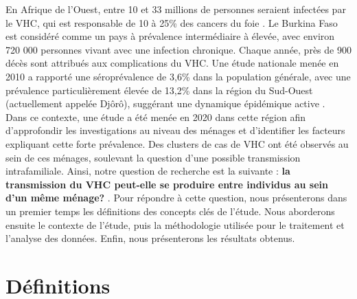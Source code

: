 \documentclass[a4paper,12pt]{article}
\begin{document}
 
En Afrique de l’Ouest, entre 10 et 33 millions de personnes seraient infectées par le VHC, qui est responsable de 10 à 25\% des cancers du foie \cite{linganiChangingEpidemiologyHepatitis2020}. Le Burkina Faso est considéré comme un pays à prévalence intermédiaire à élevée, avec environ 720 000 personnes vivant avec une infection chronique. Chaque année, près de 900 décès sont attribués aux complications du VHC. Une étude nationale menée en 2010 a rapporté une séroprévalence de 3,6\% dans la population générale, avec une prévalence particulièrement élevée de 13,2\% dans la région du Sud-Ouest (actuellement appelée Djôrô), suggérant une dynamique épidémique active \cite{medaHepatitisVirusSeroprevalence2018}. \\
 
 
 Dans ce contexte, une étude a été menée en 2020 dans cette région afin d’approfondir les investigations au niveau des ménages et d’identifier les facteurs expliquant cette forte prévalence. Des clusters de cas de VHC ont été observés au sein de ces ménages, soulevant la question d’une possible transmission intrafamiliale. Ainsi, notre question de recherche est la suivante : \textbf{la transmission du VHC peut-elle se produire entre individus au sein d’un même ménage? }. Pour répondre à cette question, nous présenterons dans un premier temps les définitions des concepts clés de l’étude. Nous aborderons ensuite le contexte de l’étude, puis la méthodologie utilisée pour le traitement et l’analyse des données. Enfin, nous présenterons les résultats obtenus.
 
 

 \newpage 
 
 \section{Définitions}
  
\end{document}
